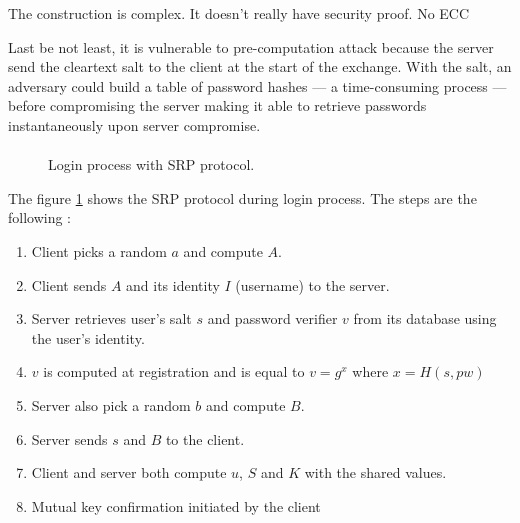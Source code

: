 \documentclass[../report.tex]{subfiles}
\begin{document}
The construction is complex.
It doesn't really have security proof.
No ECC

Last be not least, it is vulnerable to pre-computation attack because the server send the cleartext salt to the client at the start of the exchange. With the salt, an adversary could build a table of password hashes --- a time-consuming process --- before compromising the server making it able to retrieve passwords instantaneously upon server compromise.



\paragraph{}


\begin{figure}[h]
 \centering

 \setlength{\fboxsep}{10pt}
 \setlength{\fboxrule}{1pt}

 \caption{Login process with SRP protocol.}
 \label{fig:SRP}
\end{figure}

The figure \ref{fig:SRP} shows the SRP protocol during login process.
The steps are the following :

\begin{enumerate}
 \item Client picks a random $a$ and compute $A$.
 \item Client sends $A$ and its identity $I$ (username) to the server.
 \item Server retrieves user's salt $s$ and password verifier $v$ from its database using the user's identity.
 \item $v$ is computed at registration and is equal to $v = g^x$ where $x = H(s, pw)$
 \item Server also pick a random $b$ and compute $B$.
 \item Server sends $s$ and $B$ to the client.
 \item Client and server both compute $u$, $S$ and $K$ with the shared values.
 \item Mutual key confirmation initiated by the client
\end{enumerate}
\end{document}
